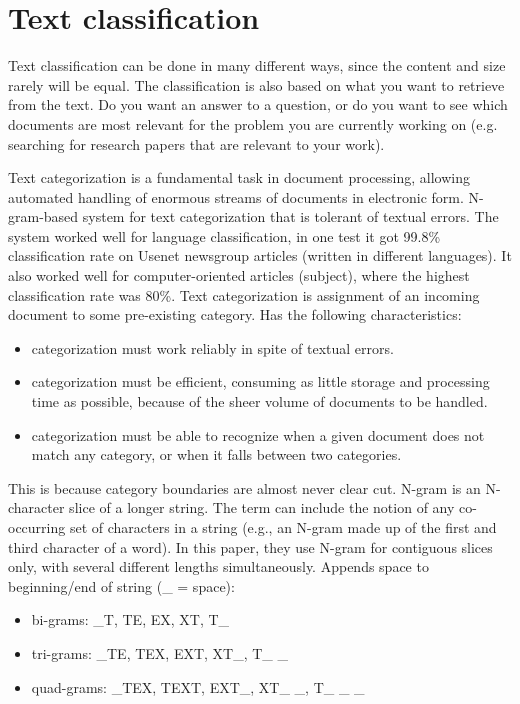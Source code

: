 \section{Text classification}
\label{sec:text_classification}
Text classification can be done in many different ways, since the content and size rarely will be equal. 
The classification is also based on what you want to retrieve from the text. 
Do you want an answer to a question, or do you want to see which documents are most relevant for the problem you are currently working on 
(e.g. searching for research papers that are relevant to your work).




Text categorization is a fundamental task in document processing, allowing automated handling of enormous streams of documents in electronic form. 
N-gram-based system for text categorization that is tolerant of textual errors. 
The system worked well for language classification, in one test it got 99.8\% classification rate on Usenet newsgroup articles (written in different languages). 
It also worked well for computer-oriented articles (subject), where the highest classification rate was 80\%.
Text categorization is assignment of an incoming document to some pre-existing category. 
Has the following characteristics:
\begin{itemize}
	\item categorization must work reliably in spite of textual errors.
	\item categorization must be efficient, consuming as little storage and processing time as possible, because of the sheer volume of documents to be handled.
	\item categorization must be able to recognize when a given document does not match any category, or when it falls between two categories. 
\end{itemize}
This is because category boundaries are almost never clear cut.
N-gram is an N-character slice of a longer string. 
The term can include the notion of any co-occurring set of characters in a string (e.g., an N-gram made up of the first and third character of a word).
In this paper, they use N-gram for contiguous slices only, with several different lengths simultaneously. 
Appends space to beginning/end of string (\_ = space): 
\begin{itemize}
	\item bi-grams: \_T, TE, EX, XT, T\_
	\item tri-grams: \_TE, TEX, EXT, XT\_, T\_ \_
	\item quad-grams: \_TEX, TEXT, EXT\_, XT\_ \_, T\_ \_ \_
\end{itemize}
